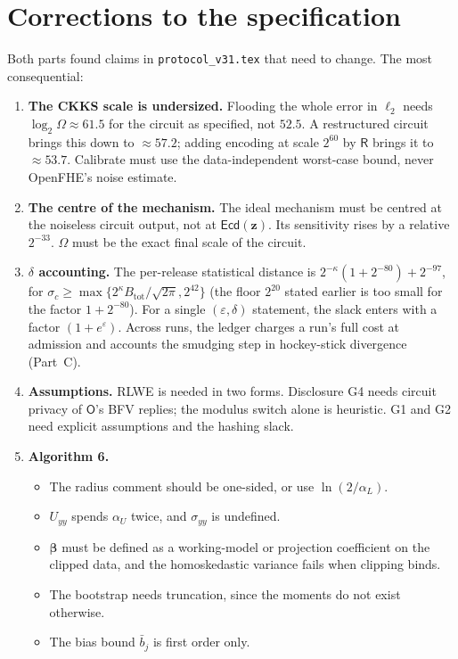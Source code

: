 \documentclass[11pt]{article}
\newcommand{\Ecd}{\mathsf{Ecd}}
\begin{document}
\section*{Corrections to the specification}
Both parts found claims in \texttt{protocol\_v31.tex} that need to change. The most consequential:
\begin{enumerate}[nosep]
  \item \textbf{The CKKS scale is undersized.} Flooding the whole error in $\ell_2$ needs $\log_2\Omega\approx61.5$ for the circuit as specified, not $52.5$. A restructured circuit brings this down to $\approx57.2$; adding encoding at scale $2^{60}$ by $\mathsf R$ brings it to $\approx53.7$. Calibrate must use the data-independent worst-case bound, never OpenFHE's noise estimate.
  \item \textbf{The centre of the mechanism.} The ideal mechanism must be centred at the noiseless circuit output, not at $\Ecd(\mathbf z)$. Its sensitivity rises by a relative $2^{-33}$. $\Omega$ must be the exact final scale of the circuit.
  \item \textbf{$\delta$ accounting.} The per-release statistical distance is $2^{-\kappa}(1+2^{-80})+2^{-97}$, for $\sigma_c\ge\max\{2^\kappa B_{\mathrm{tot}}/\sqrt{2\pi},2^{42}\}$ (the floor $2^{20}$ stated earlier is too small for the factor $1+2^{-80}$). For a single $(\varepsilon,\delta)$ statement, the slack enters with a factor $(1+e^{\varepsilon})$. Across runs, the ledger charges a run's full cost at admission and accounts the smudging step in hockey-stick divergence (Part~C).
  \item \textbf{Assumptions.} RLWE is needed in two forms. Disclosure G4 needs circuit privacy of $\mathsf O$'s BFV replies; the modulus switch alone is heuristic. G1 and G2 need explicit assumptions and the hashing slack.
  \item \textbf{Algorithm 6.}
    \begin{itemize}[nosep]
      \item The radius comment should be one-sided, or use $\ln(2/\alpha_L)$.
      \item $U_{yy}$ spends $\alpha_U$ twice, and $\sigma_{yy}$ is undefined.
      \item $\boldsymbol\beta$ must be defined as a working-model or projection coefficient on the clipped data, and the homoskedastic variance fails when clipping binds.
      \item The bootstrap needs truncation, since the moments do not exist otherwise.
      \item The bias bound $\bar b_j$ is first order only.

\end{itemize}
\end{enumerate}
\end{document}

